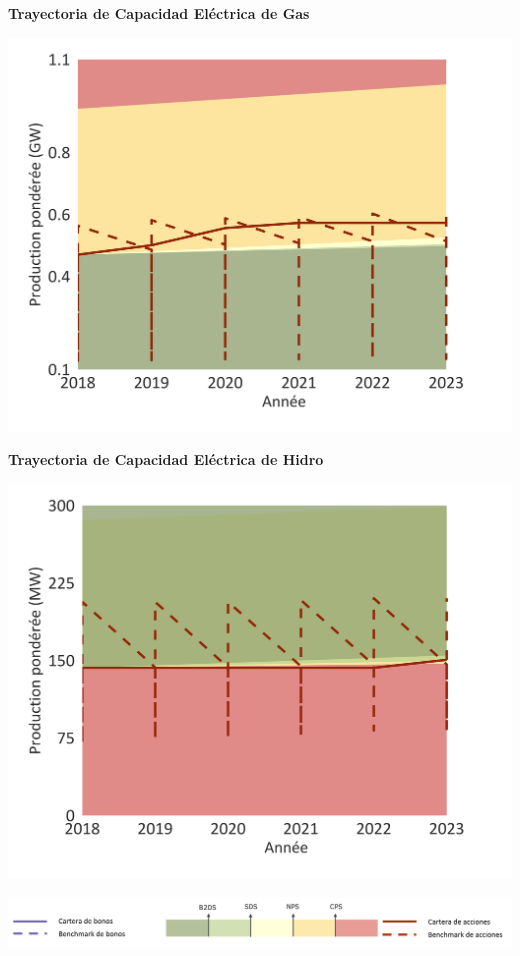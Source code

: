 \documentclass[10pt,table]{article}\usepackage[]{graphicx}\usepackage[]{color}
\begin{document}
	\begin{minipage}[t]{.49\textwidth}
		\textbf{Trayectoria de Capacidad Eléctrica de Gas }
		
		\includegraphics[trim = {0 0cm 0 0},width=1\linewidth]{ReportOutputs/Fig19}
		
		\textbf{Trayectoria de Capacidad Eléctrica de Hidro }
		
		\includegraphics[trim = {0 0cm 0 0},width=1\linewidth]{ReportOutputs/Fig20}
		
	\end{minipage}
	
	\vspace{-0.6cm}
	\begin{center}
		\includegraphics[trim = {0 0cm 0 0},width=.9\linewidth]{ReportGraphics/246Legend_ES.png}
	\end{center}
\end{document}
